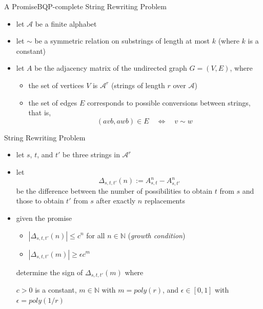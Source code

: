 \documentclass[slideColor]{prosper}
\newcommand{\N}{{\mathbb{N}}}
\newcommand{\cA}{{\mathcal{A}}}
\renewcommand{\>}{\rangle}
\newcommand{\<}{\langle}
\begin{document}
\begin{slide}{A PromiseBQP-complete String Rewriting Problem}

\begin{itemize}
\item let $\cA$ be a finite alphabet

\medskip
\item let $\sim$ be a symmetric relation on substrings of length at most $k$ (where $k$ is a constant)

\medskip
\item let $A$ be the adjacency matrix of the undirected graph $G=(V,E)$, where
\begin{itemize}

\medskip
\item the set of vertices $V$ is $\cA^r$ (strings of length $r$ over $\cA$)

\medskip
\item the set of edges $E$ corresponds to possible conversions between strings, that is,
\[
(avb,awb)\in E \quad \Longleftrightarrow \quad v\sim w\
\]
\end{itemize}
\end{itemize}
\end{slide}


\begin{slide}{String Rewriting Problem}
\begin{itemize}
\item let $s$, $t$, and $t'$ be three strings in $\cA^r$
\item let 
\[
\Delta_{s,t,t'}(n):=A_{s,t}^n - A_{s,t'}^n
\]
be the difference between the number of possibilities to obtain $t$ from $s$ and those to obtain $t'$ from $s$ after exactly $n$ replacements
\item given the promise
\begin{itemize}
\item $|\Delta_{s,t,t'}(n)| \le c^n$ for all $n\in\N$ ({\em growth condition})
\item $|\Delta_{s,t,t'}(m)|\ge \epsilon c^m$
\end{itemize}
determine the sign of $\Delta_{s,t,t'}(m)$ where

$c>0$ is a constant, $m\in\N$ with $m=poly(r)$, and $\epsilon\in [0,1]$ with $\epsilon=poly(1/r)$
\end{itemize}
\end{slide}
\end{document}
